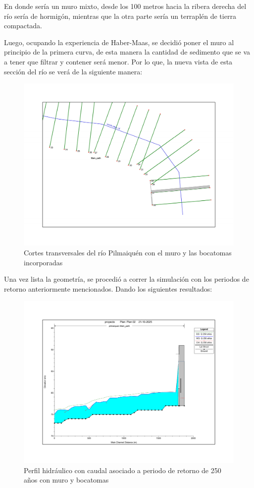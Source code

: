 \documentclass{article} %
\begin{document}
En donde sería un muro mixto, desde los 100 metros hacia la ribera derecha del río sería de hormigón, mientras que la otra parte sería un terraplén de tierra compactada.

Luego, ocupando la experiencia de Haber-Maas, se decidió poner el muro al principio de la primera curva, de esta manera la cantidad de sedimento que se va a tener que filtrar y contener será menor. Por lo que, la nueva vista de esta sección del río se verá de la siguiente manera:
\begin{figure}[H]
    \centering
    \includegraphics[width=0.6\linewidth]{imagenes/rio.pdf}
    \caption{Cortes transversales del río Pilmaiquén con el muro y las bocatomas incorporadas}
\end{figure}

Una vez lista la geometría, se procedió a correr la simulación con los periodos de retorno anteriormente mencionados. Dando los siguientes resultados:

\begin{figure}[H]
    \centering
    \includegraphics[width=0.6\linewidth]{imagenes/perfil_250_cb.pdf}
    \caption{Perfil hidráulico con caudal asociado a periodo de retorno de 250 años con muro y bocatomas}
\end{figure}
\end{document}

